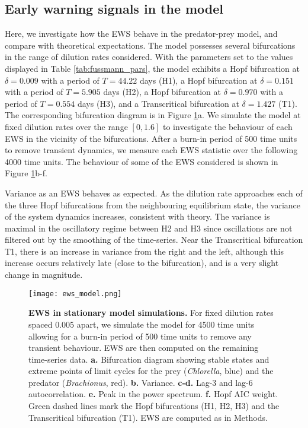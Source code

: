 \documentclass[10pt]{article}
\begin{document}
\subsection{Early warning signals in the model}

Here, we investigate how the EWS behave in the predator-prey model, and compare with theoretical expectations. The model possesses several bifurcations in the range of dilution rates considered. With the parameters set to the values displayed in Table \ref{tab:fussmann_pars}, the model exhibits a Hopf bifurcation at $\delta=0.009$ with a period of $T=44.22$ days (H1), a Hopf bifurcation at $\delta = 0.151$ with a period of $T=5.905$ days (H2), a Hopf bifurcation at $\delta = 0.970$ with a period of $T=0.554$ days (H3), and a Transcritical bifurcation at $\delta=1.427$ (T1). The corresponding bifurcation diagram is in Figure \ref{fig:ews_fussmann_model}a. We simulate the model at fixed dilution rates over the range $[0,1.6]$ to investigate the behaviour of each EWS in the vicinity of the bifurcations. After a burn-in period of 500 time units to remove transient dynamics, we measure each EWS statistic over the following 4000 time units. The behaviour of some of the EWS considered is shown in Figure \ref{fig:ews_fussmann_model}b-f.

Variance as an EWS behaves as expected. As the dilution rate approaches each of the three Hopf bifurcations from the neighbouring equilibrium state, the variance of the system dynamics increases, consistent with theory. The variance is maximal in the oscillatory regime between H2 and H3 since oscillations are not filtered out by the smoothing of the time-series. Near the Transcritical bifurcation T1, there is an increase in variance from the right and the left, although this increase occurs relatively late (close to the bifurcation), and is a very slight change in magnitude.



\begin{figure}[H]
\centering
\texttt{[image: ews\_model.png]}
\vspace{0.4cm}
\caption{\textbf{EWS in stationary model simulations.} For fixed dilution rates spaced 0.005 apart, we simulate the model for 4500 time units allowing for a burn-in period of 500 time units to remove any transient behaviour. EWS are then computed on the remaining time-series data. \textbf{a.} Bifurcation diagram showing stable states and extreme points of limit cycles for the prey (\textit{Chlorella}, blue) and the predator (\textit{Brachionus}, red). \textbf{b.} Variance. \textbf{c-d.} Lag-3 and lag-6 autocorrelation. \textbf{e.} Peak in the power spectrum. \textbf{f.} Hopf AIC weight. Green dashed lines mark the Hopf bifurcations (H1, H2, H3) and the Transcritical bifurcation (T1). EWS are computed as in Methods.} 
\label{fig:ews_fussmann_model}
\end{figure}
\end{document}
